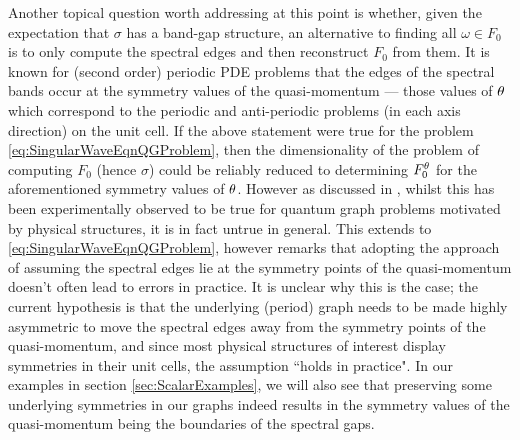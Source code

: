 Another topical question worth addressing at this point is whether, given the expectation that $\sigma$ has a band-gap structure, an alternative to finding all $\omega\in F_0$ is to only compute the spectral edges and then reconstruct $F_0$ from them.
It is known for (second order) periodic PDE problems that the edges of the spectral bands occur at the symmetry values of the quasi-momentum --- those values of $\theta$ which correspond to the periodic and anti-periodic problems (in each axis direction) on the unit cell.
If the above statement were true for the problem \eqref{eq:SingularWaveEqnQGProblem}, then the dimensionality of the problem of computing $F_0$ (hence $\sigma$) could be reliably reduced to determining $F_0^\theta$ for the aforementioned symmetry values of $\theta$.
However as discussed in \cite[Chapter 4.6]{berkolaiko2013introduction}, whilst this has been experimentally observed to be true for quantum graph problems motivated by physical structures, it is in fact untrue in general.
This extends to \eqref{eq:SingularWaveEqnQGProblem}, however \cite[Chapter 4.6]{berkolaiko2013introduction} remarks that adopting the approach of assuming the spectral edges lie at the symmetry points of the quasi-momentum doesn't often lead to errors in practice.
It is unclear why this is the case; the current hypothesis is that the underlying (period) graph needs to be made highly asymmetric to move the spectral edges away from the symmetry points of the quasi-momentum, and since most physical structures of interest display symmetries in their unit cells, the assumption ``holds in practice".
In our examples in section \ref{sec:ScalarExamples}, we will also see that preserving some underlying symmetries in our graphs indeed results in the symmetry values of the quasi-momentum being the boundaries of the spectral gaps.